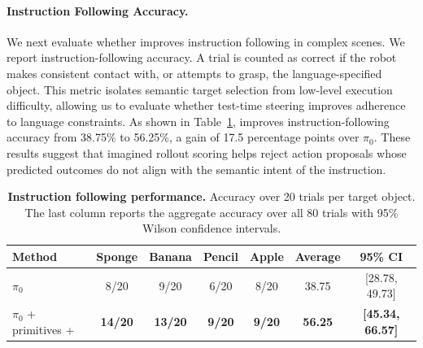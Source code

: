 \paragraph{Instruction Following Accuracy.}

We next evaluate whether \coolname{} improves instruction following in complex scenes.  We report instruction-following accuracy. A trial is counted as correct if the robot makes consistent contact with, or attempts to grasp, the language-specified object. This metric isolates semantic target selection from low-level execution difficulty, allowing us to evaluate whether test-time steering improves adherence to language constraints. As shown in Table~\ref{tab:instruction-following}, \coolname{} improves instruction-following accuracy from 38.75\% to 56.25\%, a gain of 17.5 percentage points over $\pi_0$. These results suggest that imagined rollout scoring helps reject action proposals whose predicted outcomes do not align with the semantic intent of the instruction.




\begin{table}[h]
\caption{\textbf{Instruction following performance.}
Accuracy over 20 trials per target object. The last column reports the aggregate accuracy over all 80 trials with 95\% Wilson confidence intervals.}
\label{tab:instruction-following}

\centering
\scriptsize
\setlength{\tabcolsep}{3pt}
\renewcommand{\arraystretch}{0.82}

\begin{tabular}{lcccccc}
\toprule
Method & Sponge & Banana & Pencil & Apple & Average & 95\% CI \\
\midrule

$\pi_0$
& 8/20 & 9/20 & 6/20 & 8/20
& 38.75
& [28.78, 49.73] \\

\midrule

$\pi_0$ + primitives + \coolname{}
& \textbf{14/20}
& \textbf{13/20}
& \textbf{9/20}
& \textbf{9/20}
& \textbf{56.25}
& \textbf{[45.34, 66.57]} \\

\bottomrule
\end{tabular}

\vspace{-6pt}
\end{table}




